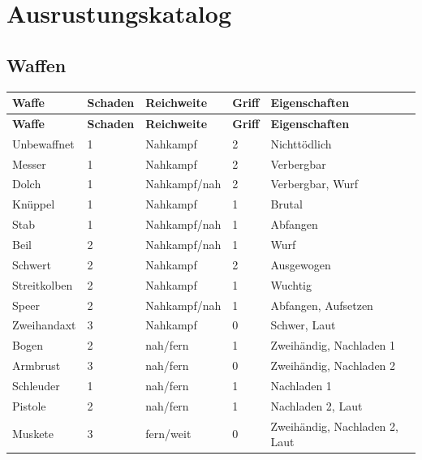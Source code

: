\chapter{Ausrustungskatalog}
\label{app:equipment}


\section{Waffen}
\begin{longtable}{p{}p{}p{}p{}p{}}
    \toprule
    \textbf{Waffe} & \textbf{Schaden} & \textbf{Reichweite} & \textbf{Griff} & \textbf{Eigenschaften} \\
    \midrule
    \endfirsthead
    \toprule
    \textbf{Waffe} & \textbf{Schaden} & \textbf{Reichweite} & \textbf{Griff} & \textbf{Eigenschaften} \\
    \midrule
    \endhead

    Unbewaffnet & 1 & Nahkampf & 2 & Nichttödlich \\
    Messer & 1 & Nahkampf & 2 & Verbergbar \\
    Dolch & 1 & Nahkampf/nah & 2 & Verbergbar, Wurf \\
    Knüppel & 1 & Nahkampf & 1 & Brutal \\
    Stab & 1 & Nahkampf/nah & 1 & Abfangen \\
    Beil & 2 & Nahkampf/nah & 1 & Wurf \\
    Schwert & 2 & Nahkampf & 2 & Ausgewogen \\
    Streitkolben & 2 & Nahkampf & 1 & Wuchtig \\
    Speer & 2 & Nahkampf/nah & 1 & Abfangen, Aufsetzen \\
    Zweihandaxt & 3 & Nahkampf & 0 & Schwer, Laut \\
    Bogen & 2 & nah/fern & 1 & Zweihändig, Nachladen 1 \\
    Armbrust & 3 & nah/fern & 0 & Zweihändig, Nachladen 2 \\
    Schleuder & 1 & nah/fern & 1 & Nachladen 1 \\
    Pistole & 2 & nah/fern & 1 & Nachladen 2, Laut \\
    Muskete & 3 & fern/weit & 0 & Zweihändig, Nachladen 2, Laut \\

    \bottomrule
\end{longtable}

